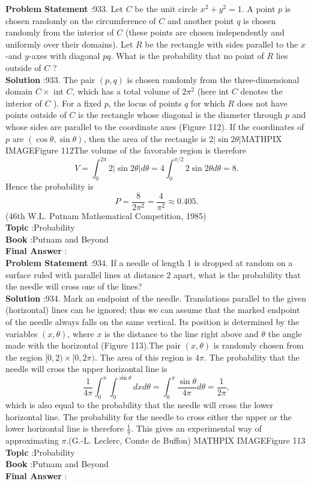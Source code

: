 \documentclass[10pt]{article}
\begin{document}
\textbf{Problem Statement} :933. Let $C$ be the unit circle $x^{2}+y^{2}=1$. A point $p$ is chosen randomly on the circumference of $C$ and another point $q$ is chosen randomly from the interior of $C$ (these points are chosen independently and uniformly over their domains). Let $R$ be the rectangle with sides parallel to the $x$-and $y$-axes with diagonal $p q$. What is the probability that no point of $R$ lies outside of $C$ ?\\
\textbf{Solution} :933. The pair $(p, q)$ is chosen randomly from the three-dimensional domain $C \times$ int $C$, which has a total volume of $2 \pi^{2}$ (here int $C$ denotes the interior of $C$ ). For a fixed $p$, the locus of points $q$ for which $R$ does not have points outside of $C$ is the rectangle whose diagonal is the diameter through $p$ and whose sides are parallel to the coordinate axes (Figure 112). If the coordinates of $p$ are $(\cos \theta, \sin \theta)$, then the area of the rectangle is $2|\sin 2 \theta|$MATHPIX IMAGEFigure 112The volume of the favorable region is therefore$$ V=\int_{0}^{2 \pi} 2|\sin 2 \theta| d \theta=4 \int_{0}^{\pi / 2} 2 \sin 2 \theta d \theta=8 . $$Hence the probability is$$ P=\frac{8}{2 \pi^{2}}=\frac{4}{\pi^{2}} \approx 0.405 . $$(46th W.L. Putnam Mathematical Competition, 1985)\\
\textbf{Topic} :Probability\\
\textbf{Book} :Putnam and Beyond\\
\textbf{Final Answer} :\\


\textbf{Problem Statement} :934. If a needle of length 1 is dropped at random on a surface ruled with parallel lines at distance 2 apart, what is the probability that the needle will cross one of the lines?\\
\textbf{Solution} :934. Mark an endpoint of the needle. Translations parallel to the given (horizontal) lines can be ignored; thus we can assume that the marked endpoint of the needle always falls on the same vertical. Its position is determined by the variables $(x, \theta)$, where $x$ is the distance to the line right above and $\theta$ the angle made with the horizontal (Figure 113).The pair $(x, \theta)$ is randomly chosen from the region $[0,2) \times[0,2 \pi)$. The area of this region is $4 \pi$. The probability that the needle will cross the upper horizontal line is$$ \frac{1}{4 \pi} \int_{0}^{\pi} \int_{0}^{\sin \theta} d x d \theta=\int_{0}^{\pi} \frac{\sin \theta}{4 \pi} d \theta=\frac{1}{2 \pi}, $$which is also equal to the probability that the needle will cross the lower horizontal line. The probability for the needle to cross either the upper or the lower horizontal line is therefore $\frac{1}{\pi}$. This gives an experimental way of approximating $\pi$.(G.-L. Leclerc, Comte de Buffon) MATHPIX IMAGEFigure 113\\
\textbf{Topic} :Probability\\
\textbf{Book} :Putnam and Beyond\\
\textbf{Final Answer} :\\
\end{document}
